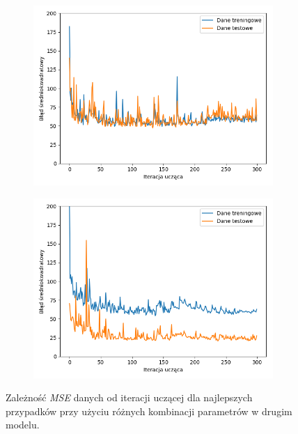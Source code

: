\documentclass[12pt]{aghdpl}
\begin{document}
\begin{figure}[h]
		 	\begin{subfigure}{.5\linewidth}
		 		\includegraphics[width =\linewidth]{wykresy/4_zwiekszenie_stopnia_skomplikowania_modelu/2_warstwy_20_neuronow_wykres_uczenia.png}
		 	\end{subfigure}
		 	\begin{subfigure}{.5\linewidth}
		 		\includegraphics[width =\linewidth]{wykresy/4_zwiekszenie_stopnia_skomplikowania_modelu/2_warstwy_40_neuronow_wykres_uczenia.png}
		 	\end{subfigure}
	 	
 			\caption{Zależność \textit{MSE} danych od iteracji uczącej dla najlepszych przypadków przy użyciu różnych kombinacji parametrów w drugim modelu.}
			\label{fig: drugi_model_kombinacje_parametrow_wykresy_uczenia}
		\end{figure}
		
\end{document}
